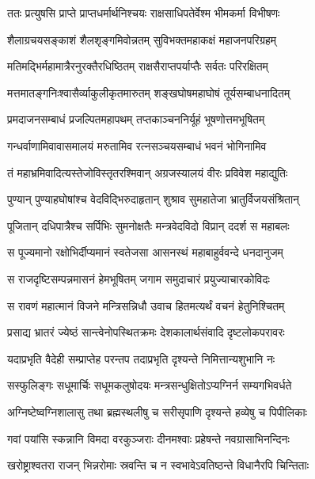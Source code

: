 
\twolineshloka
{ततः प्रत्युषसि प्राप्ते प्राप्तधर्मार्थनिश्चयः}
{राक्षसाधिपतेर्वेश्म भीमकर्मा विभीषणः} %

\twolineshloka
{शैलाग्रचयसङ्काशं शैलशृङ्गमिवोन्नतम्}
{सुविभक्तमहाकक्षं महाजनपरिग्रहम्} %

\twolineshloka
{मतिमद्भिर्महामात्रैरनुरक्तैरधिष्ठितम्}
{राक्षसैराप्तपर्याप्तैः सर्वतः परिरक्षितम्} %

\twolineshloka
{मत्तमातङ्गनिःश्वासैर्व्याकुलीकृतमारुतम्}
{शङ्खघोषमहाघोषं तूर्यसम्बाधनादितम्} %

\twolineshloka
{प्रमदाजनसम्बाधं प्रजल्पितमहापथम्}
{तप्तकाञ्चननिर्यूहं भूषणोत्तमभूषितम्} %

\twolineshloka
{गन्धर्वाणामिवावासमालयं मरुतामिव}
{रत्नसञ्चयसम्बाधं भवनं भोगिनामिव} %

\twolineshloka
{तं महाभ्रमिवादित्यस्तेजोविस्तृतरश्मिवान्}
{अग्रजस्यालयं वीरः प्रविवेश महाद्युतिः} %

\twolineshloka
{पुण्यान् पुण्याहघोषांश्च वेदविद्भिरुदाहृतान्}
{शुश्राव सुमहातेजा भ्रातुर्विजयसंश्रितान्} %

\twolineshloka
{पूजितान् दधिपात्रैश्च सर्पिभिः सुमनोक्षतैः}
{मन्त्रवेदविदो विप्रान् ददर्श स महाबलः} %

\twolineshloka
{स पूज्यमानो रक्षोभिर्दीप्यमानं स्वतेजसा}
{आसनस्थं महाबाहुर्ववन्दे धनदानुजम्} %

\twolineshloka
{स राजदृष्टिसम्पन्नमासनं हेमभूषितम्}
{जगाम समुदाचारं प्रयुज्याचारकोविदः} %

\twolineshloka
{स रावणं महात्मानं विजने मन्त्रिसन्निधौ}
{उवाच हितमत्यर्थं वचनं हेतुनिश्चितम्} %

\twolineshloka
{प्रसाद्य भ्रातरं ज्येष्ठं सान्त्वेनोपस्थितक्रमः}
{देशकालार्थसंवादि दृष्टलोकपरावरः} %

\twolineshloka
{यदाप्रभृति वैदेही सम्प्राप्तेह परन्तप}
{तदाप्रभृति दृश्यन्ते निमित्तान्यशुभानि नः} %

\twolineshloka
{सस्फुलिङ्गः सधूमार्चिः सधूमकलुषोदयः}
{मन्त्रसन्धुक्षितोऽप्यग्निर्न सम्यगभिवर्धते} %

\twolineshloka
{अग्निष्टेष्वग्निशालासु तथा ब्रह्मस्थलीषु च}
{सरीसृपाणि दृश्यन्ते हव्येषु च पिपीलिकाः} %

\twolineshloka
{गवां पयांसि स्कन्नानि विमदा वरकुञ्जराः}
{दीनमश्वाः प्रहेषन्ते नवग्रासाभिनन्दिनः} %

\twolineshloka
{खरोष्ट्राश्वतरा राजन् भिन्नरोमाः स्रवन्ति च}
{न स्वभावेऽवतिष्ठन्ते विधानैरपि चिन्तिताः} %

